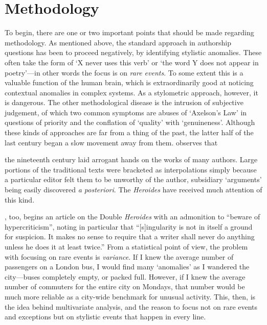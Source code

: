 \documentclass[twocolumn, switch, a4paper]{article} %
\begin{document}
\section{Methodology}
\label{sec: methodology}

To begin, there are one or two important points that should be made regarding
methodology. As mentioned above, the standard approach in authorship questions
has been to proceed negatively, by identifying stylistic anomalies. These
often take the form of `X never uses this verb' or `the word Y does not appear
in poetry'---in other words the focus is on \emph{rare events}. To some extent
this is a valuable function of the human brain, which is extraordinarily good
at noticing contextual anomalies in complex systems. As a stylometric
approach, however, it is dangerous. The other methodological disease is the
intrusion of subjective judgement, of which two common symptoms are abuses of
`Axelson's Law' in questions of priority and the conflation of `quality' with
`genuineness'. Although these kinds of approaches are far from a thing of the
past, the latter half of the last century began a slow movement away from
them.  observes that

\begin{adjustwidth}{0.07\linewidth}{0.07\linewidth}
\footnotesize%
the nineteenth century laid arrogant hands on the works of many authors. Large
portions of the traditional texts were bracketed as interpolations simply
because a particular editor felt them to be unworthy of the author, subsidiary
`arguments' being easily discovered \emph{a posteriori}. The \emph{Heroides}
have received much attention of this kind.
\end{adjustwidth}

, too, begins an article on the Double \emph{Heroides}
with an admonition to ``beware of hypercriticism'', noting in particular that
``[s]ingularity is not in itself a ground for suspicion. It makes no sense to
require that a writer shall never do anything unless he does it at least
twice.'' From a statistical point of view, the problem with focusing on rare
events is \emph{variance}. If I knew the average number of passengers on a
London bus, I would find many `anomalies' as I wandered the city---buses
completely empty, or packed full. However, if I knew the average number of
commuters for the entire city on Mondays, that number would be much more
reliable as a city-wide benchmark for unusual activity. This, then, is the idea
behind multivariate analysis, and the reason to focus not on rare events and
exceptions but on stylistic events that happen in every line.
\end{document}
